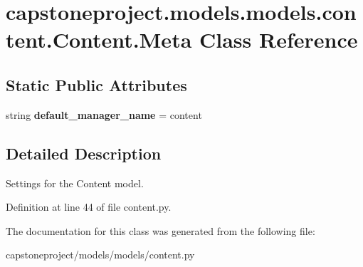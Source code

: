 \hypertarget{classcapstoneproject_1_1models_1_1models_1_1content_1_1_content_1_1_meta}{}\section{capstoneproject.\+models.\+models.\+content.\+Content.\+Meta Class Reference}
\label{classcapstoneproject_1_1models_1_1models_1_1content_1_1_content_1_1_meta}
\subsection*{Static Public Attributes}
\begin{DoxyCompactItemize}
\item 
\mbox{\label{classcapstoneproject_1_1models_1_1models_1_1content_1_1_content_1_1_meta_a9a92d1a24032e86eafff88f1d0ef583a}} 
string {\bfseries default\+\_\+manager\+\_\+name} = \textquotesingle{}content\textquotesingle{}
\end{DoxyCompactItemize}


\subsection{Detailed Description}
\begin{DoxyVerb}Settings for the Content model.\end{DoxyVerb}
 

Definition at line 44 of file content.\+py.



The documentation for this class was generated from the following file\+:\begin{DoxyCompactItemize}
\item 
capstoneproject/models/models/content.\+py\end{DoxyCompactItemize}

